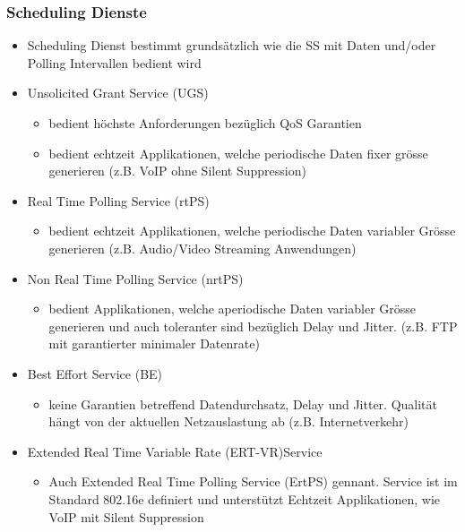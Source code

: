 \subsubsection{Scheduling Dienste}
\begin{itemize}
\item Scheduling Dienst bestimmt grundsätzlich wie die SS mit Daten und/oder Polling Intervallen bedient wird
\item Unsolicited Grant Service (UGS)
\begin{itemize}
\item bedient höchste Anforderungen bezüglich QoS Garantien
\item bedient echtzeit Applikationen, welche periodische Daten fixer grösse generieren (z.B. VoIP ohne Silent Suppression)
\end{itemize}
\item Real Time Polling Service (rtPS)
\begin{itemize}
\item bedient echtzeit Applikationen, welche periodische Daten variabler Grösse generieren (z.B. Audio/Video Streaming Anwendungen)
\end{itemize}
\item Non Real Time Polling Service (nrtPS)
\begin{itemize}
\item bedient Applikationen, welche aperiodische Daten variabler Grösse generieren und auch toleranter sind bezüglich Delay und Jitter. (z.B. FTP mit garantierter minimaler Datenrate)
\end{itemize}
\item Best Effort Service (BE)
\begin{itemize}
\item keine Garantien betreffend Datendurchsatz, Delay und Jitter. Qualität hängt von der aktuellen Netzauslastung ab (z.B. Internetverkehr)
\end{itemize}
\item Extended Real Time Variable Rate (ERT-VR)Service
\begin{itemize}
\item Auch Extended Real Time Polling Service (ErtPS) gennant. Service ist im Standard 802.16e definiert und unterstützt Echtzeit Applikationen, wie VoIP mit Silent Suppression 
\end{itemize}
\end{itemize}

